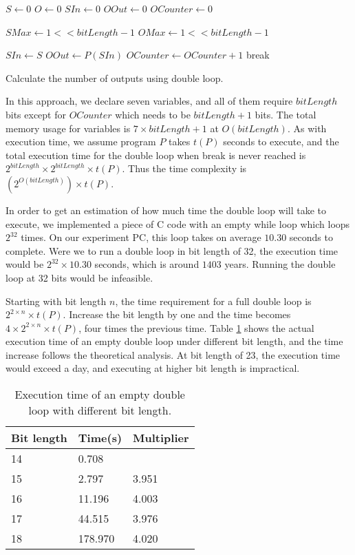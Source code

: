 \begin{algorithm}
\begin{algorithmic}
\STATE $S \leftarrow 0$
\STATE $O \leftarrow 0$
\STATE $SIn \leftarrow 0$
\STATE $OOut \leftarrow 0$
\STATE $OCounter \leftarrow 0$

\STATE $SMax \leftarrow 1 << bitLength - 1$
\STATE $OMax \leftarrow 1 << bitLength - 1$

\STATE $SIn \leftarrow S$ 
\STATE $OOut \leftarrow P(SIn)$ 
\STATE $OCounter \leftarrow OCounter + 1$
\STATE break
\ENDIF
\ENDFOR
\ENDFOR
\end{algorithmic}

\caption[Double loop]{Calculate the number of outputs using double loop.}
\label{alg:doubleLoop}
\end{algorithm}

In this approach, we declare seven variables, and all of them require $bitLength$ bits except for $OCounter$ which needs to be $bitLength + 1$ bits. The total memory usage for variables is $7 \times bitLength + 1$ at $O(bitLength)$. As with execution time, we assume program $P$ takes $t(P)$ seconds to execute, and the total execution time for the double loop when break is never reached is $2^{bitLength} \times 2^{bitLength} \times t(P)$. Thus the time complexity is $(2^{O(bitLength)}) \times t(P)$.

In order to get an estimation of how much time the double loop will take to execute, we implemented a piece of C code with an empty while loop which loops $2^{32}$ times. On our experiment PC, this loop takes on average $10.30$ seconds to complete. Were we to run a double loop in bit length of 32, the execution time would be $2^{32} \times 10.30$ seconds, which is around $1403$ years. Running the double loop at 32 bits would be infeasible.

Starting with bit length $n$, the time requirement for a full double loop is $2^{2 \times n} \times t(P)$. Increase the bit length by one and the time becomes $4 \times 2^{2 \times n} \times t(P)$, four times the previous time. Table \ref{tab:gccRun} shows the actual execution time of an empty double loop under different bit length, and the time increase follows the theoretical analysis. At bit length of 23, the execution time would exceed a day, and executing at higher bit length is impractical.

\begin{table}
\centering
\begin{tabular}{|l|l|l|}
\hline Bit length & Time(s) & Multiplier\\
\hline 14 & 0.708 & 	\\
\hline 15 & 2.797 & 3.951	\\
\hline 16 & 11.196	& 4.003	\\
\hline 17 & 44.515	& 3.976	\\
\hline 18 & 178.970	& 4.020	\\
\hline 
\end{tabular}
\caption{Execution time of an empty double loop with different bit length.}
\label{tab:gccRun}
\end{table}

